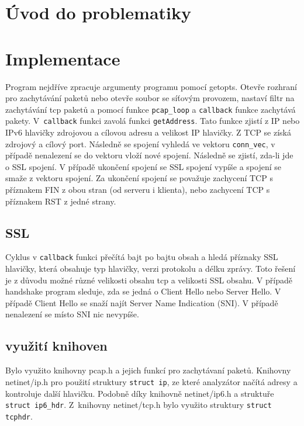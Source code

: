 \documentclass[a4paper, 12pt, titlepage]{article}
\begin{document}

\tableofcontents
\newpage

\section{Úvod do problematiky}



\section{Implementace}
Program nejdříve zpracuje argumenty programu pomocí getopts\cite{getopt}. Otevře rozhraní pro zachytávání paketů nebo otevře soubor se síťovým provozem, nastaví filtr na zachytávání tcp paketů a pomocí funkce \verb|pcap_loop| a \verb|callback| funkce\cite{pcap} zachytává pakety. V~\verb|callback| funkci zavolá funkci \verb|getAddress|. Tato funkce zjistí z IP nebo IPv6 hlavičky zdrojovou a cílovou adresu a velikost IP hlavičky. Z TCP se získá zdrojový a cílový port. Následně se spojení vyhledá ve vektoru \verb|conn_vec|, v případě nenalezení se do vektoru vloží nové spojení. Následně se zjistí, zda-li jde o SSL spojení. V případě ukončení spojení se SSL spojení vypíše a spojení se smaže z vektoru spojení. Za ukončení spojení se považuje zachycení TCP s příznakem FIN z obou stran (od serveru i klienta), nebo zachycení TCP s příznakem RST z jedné strany.


\subsection{SSL}
Cyklus v \verb|callback| funkci přečítá bajt po bajtu obsah a hledá příznaky SSL hlavičky, která obsahuje typ hlavičky, verzi protokolu a délku zprávy. Toto řešení je z důvodu možné různé velikosti obsahu tcp a velikosti SSL obsahu. V případě handshake program sleduje, zda se jedná o Client Hello nebo Server Hello. V případě Client Hello se snaží najít Server Name Indication (SNI). V případě nenalezení se místo SNI nic nevypíše.


\subsection{využití knihoven}

Bylo využito knihovny pcap.h a jejich funkcí pro zachytávaní paketů. Knihovny netinet/ip.h pro použití struktury \verb|struct ip|, ze které analyzátor načítá adresy a kontroluje další hlavičku. Podobně díky knihovně netinet/ip6.h a struktuře \verb|struct ip6_hdr|. Z~knihovny netinet/tcp.h bylo využito struktury \verb|struct tcphdr|. 
\end{document}
